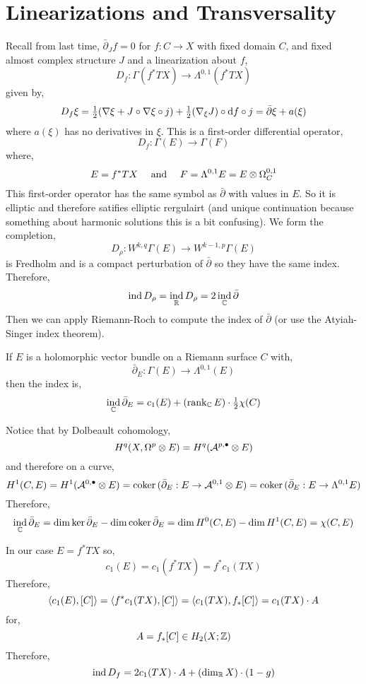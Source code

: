 \documentclass[12pt]{article}
\newcommand{\dbar}{\bar{\partial}}
\DeclareMathOperator{\ind}{\mathrm{ind}}
\begin{document}
\section{Linearizations and Transversality}

Recall from last time, $\dbar_J f = 0$ for $f : C \to X$ with fixed domain $C$, and fixed almost complex structure $J$ and a linearization about $f$,
\[ D_f : \Gamma(f^* TX) \to \Lambda^{0,1} (f^* TX) \]
given by,
\[ D_f \xi = \tfrac{1}{2}(\nabla \xi + J \circ \nabla \xi \circ j) + \tfrac{1}{2} (\nabla_\xi J) \circ \d{f} \circ j = \dbar \xi + a(\xi) \]
where $a(\xi)$ has no derivatives in $\xi$. This is a first-order differential operator,
\[ D_f : \Gamma(E) \to \Gamma(F) \]
where,
\[ E = f^* TX \quad \text{ and } \quad F = \Lambda^{0,1} E = E \otimes \Omega^{0,1}_C  \]
This first-order operator has the same symbol as $\dbar$ with values in $E$. So it is elliptic and therefore satifies elliptic rergulairt (and unique continuation because something about harmonic solutions this is a bit confusing). We form the completion,
\[ D_\rho : W^{k,q} \Gamma(E) \to W^{k-1, p} \Gamma(E) \]
is Fredholm and is a compact perturbation of $\dbar$ so they have the same index. Therefore,
\[ \ind{D_\rho} = \ind_{\RR} D_\rho = 2 \ind_{\CC} \dbar \]
Then we can apply Riemann-Roch to compute the index of $\dbar$ (or use the Atyiah-Singer index theorem).

\begin{thm}
If $E$ is a holomorphic vector bundle on a Riemann surface $C$ with,
\[ \dbar_E : \Gamma(E) \to \Lambda^{0,1}(E) \]
then the index is,
\[ \ind_{\CC} \dbar_E = c_1(E) + (\rank_{\CC} E) \cdot \tfrac{1}{2} \chi(C) \]
\end{thm}

\begin{rmk}
Notice that by Dolbeault cohomology,
\[ H^q(X, \Omega^p \otimes E) = H^q(\mathcal{A}^{p,\bullet} \otimes E) \] 
and therefore on a curve,
\[ H^1(C, E) = H^1(\mathcal{A}^{0,\bullet} \ot E) = \coker{(\dbar_E : E \to \mathcal{A}^{0,1} \ot E)} = \coker{(\dbar_E : E \to \Lambda^{0,1} E)} \]
Therefore,
\[ \ind_{\CC} \dbar_E = \dim{\ker{\dbar_E}} - \dim{\coker{\dbar_E}} = \dim{H^0(C, E)} - \dim{H^1(C, E)} = \chi(C, E) \]
\end{rmk}

\begin{rmk}
In our case $E = f^* TX$ so,
\[ c_1(E) = c_1(f^* TX) = f^* c_1(TX) \]
Therefore,
\[ \left< c_1(E), [C] \right> = \left< f^* c_1(TX), [C] \right> = \left< c_1(TX), f_*[C] \right> = c_1(TX) \cdot A \]
for,
\[ A = f_* [C] \in H_2(X;\mathbb{Z}) \]
Therefore,
\[ \ind{D_f} = 2 c_1(TX) \cdot A  + (\dim_{\RR} X) \cdot (1 - g) \]
\end{rmk}
\end{document}

